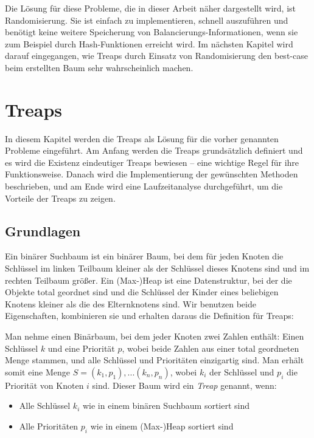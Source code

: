 \documentclass[a4paper]{scrreprt}
\theoremstyle{definition}
\begin{document}
Die Lösung für diese Probleme, die in dieser Arbeit näher dargestellt wird, ist Randomisierung.
Sie ist einfach zu implementieren, schnell auszuführen und benötigt keine weitere Speicherung von Balancierungs-Informationen, wenn sie zum Beispiel durch Hash-Funktionen erreicht wird.
Im nächsten Kapitel wird darauf eingegangen, wie Treaps durch Einsatz von Randomisierung den best-case beim erstellten Baum sehr wahrscheinlich machen.

\chapter{Treaps}
\label{sec:treaps}

In diesem Kapitel werden die Treaps als Lösung für die vorher genannten Probleme eingeführt.
Am Anfang werden die Treaps grundsätzlich definiert und es wird die Existenz eindeutiger Treaps bewiesen -- eine wichtige Regel für ihre Funktionsweise.
Danach wird die Implementierung der gewünschten Methoden beschrieben, und am Ende wird eine Laufzeitanalyse durchgeführt, um die Vorteile der Treaps zu zeigen.

\section{Grundlagen}
\label{sec:treapsbasics}

Ein binärer Suchbaum ist ein binärer Baum, bei dem für jeden Knoten die Schlüssel im linken Teilbaum kleiner als der Schlüssel dieses Knotens sind und im rechten Teilbaum größer.
Ein (Max-)Heap ist eine Datenstruktur, bei der die Objekte total geordnet sind und die Schlüssel der Kinder eines beliebigen Knotens kleiner als die des Elternknotens sind.
Wir benutzen beide Eigenschaften, kombinieren sie und erhalten daraus die Definition für Treaps:

Man nehme einen Binärbaum, bei dem jeder Knoten zwei Zahlen enthält: Einen Schlüssel $k$ und eine Priorität $p$, wobei beide Zahlen aus einer total geordneten Menge stammen, und alle Schlüssel und Prioritäten einzigartig sind. Man erhält somit eine Menge $S = {(k_1, p_1), ... (k_n, p_n)}$, wobei $k_i$ der Schlüssel und $p_i$ die Priorität von Knoten $i$ sind. Dieser Baum wird ein \emph{Treap} genannt, wenn:

\begin{itemize}
\item Alle Schlüssel $k_i$ wie in einem binären Suchbaum sortiert sind
\item Alle Prioritäten $p_i$ wie in einem (Max-)Heap sortiert sind
\end{itemize}
\end{document}
